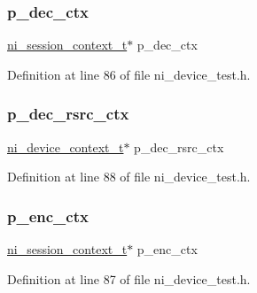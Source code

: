 \subsubsection{\texorpdfstring{p\_dec\_ctx}{p\_dec\_ctx}}
{\footnotesize\ttfamily \mbox{\hyperlink{ni__device__api_8h_a9fdb59b68eed0a6ee64b44827cbb729d}{ni\+\_\+session\+\_\+context\+\_\+t}}$\ast$ p\+\_\+dec\+\_\+ctx}



Definition at line 86 of file ni\+\_\+device\+\_\+test.\+h.

\mbox{\label{struct_recv_data_struct___aa1910cac8a0d830cdefe42be0f679340}} 
\subsubsection{\texorpdfstring{p\_dec\_rsrc\_ctx}{p\_dec\_rsrc\_ctx}}
{\footnotesize\ttfamily \mbox{\hyperlink{ni__rsrc__api_8h_a880a361e6e867b45d102656e813a046f}{ni\+\_\+device\+\_\+context\+\_\+t}}$\ast$ p\+\_\+dec\+\_\+rsrc\+\_\+ctx}



Definition at line 88 of file ni\+\_\+device\+\_\+test.\+h.

\mbox{\label{struct_recv_data_struct___a0dcef0baa36ca3470b4c561444d1b68c}} 
\subsubsection{\texorpdfstring{p\_enc\_ctx}{p\_enc\_ctx}}
{\footnotesize\ttfamily \mbox{\hyperlink{ni__device__api_8h_a9fdb59b68eed0a6ee64b44827cbb729d}{ni\+\_\+session\+\_\+context\+\_\+t}}$\ast$ p\+\_\+enc\+\_\+ctx}



Definition at line 87 of file ni\+\_\+device\+\_\+test.\+h.

\mbox{\label{struct_recv_data_struct___a09d92e4609148acb4d096280e071c557}} 
